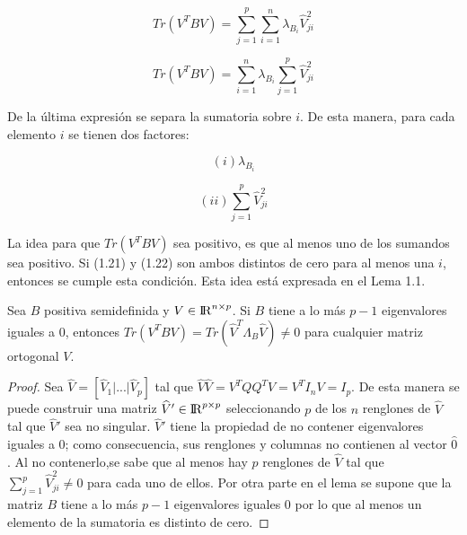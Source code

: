 \begin{equation*} 
Tr(V^T B V) = \sum \limits_{j=1}^{p} \sum\limits_{i=1}^{n} \lambda_{B_i} \widehat{V}_{ji}^2
\end{equation*}

\begin{equation}\label{eq:2.21}
Tr(V^T B V) = \sum\limits_{i=1}^{n} \lambda_{B_i} \sum \limits_{j=1}^{p} \widehat{V}_{ji}^2    
\end{equation}

De la última expresión se separa la sumatoria sobre $i$. De esta manera, para cada elemento $i$ se tienen dos factores:

\begin{equation}\label{eq:2.22}
(i) \lambda_{B_i}
\end{equation}

 \begin{equation}\label{eq:2.23}
 (ii) \sum \limits_{j=1}^{p} \widehat{V}_{ji}^2   
 \end{equation}
 

 La idea para que $Tr(V^T B V)$ sea positivo, es que al menos uno de los sumandos sea positivo. Si (1.21) y (1.22) son ambos distintos de cero para al menos una $i$, entonces se cumple esta condición. Esta idea está expresada en el Lema 1.1.

\begin{lemma}\label{lemma2.4}
Sea $B$ positiva semidefinida y $V \in {\rm I\!R}^{n\times p}$. Si $B$ tiene a lo más $p-1$ eigenvalores iguales a $0$, entonces $Tr(V^T B V)  = Tr(\widehat{V}^T \Lambda_{B} \widehat{V}) \neq 0$  para cualquier matriz ortogonal $V$.
\end{lemma}

\begin{proof}
Sea $\widehat{V} = [\widehat{V}_1 | ... | \widehat{V}_p]$ tal que $\widehat{V} \widehat{V} = V^T Q Q^T V = V^T I_n V  = I_p$. De esta manera se puede construir una matriz $\widehat{V}' \in {\rm I\!R}^{p \times p}$ seleccionando $p$ de los $n$ renglones de $\widehat{V}$ tal que $\widehat{V}'$ sea no singular. $\widehat{V}'$ tiene la propiedad de no contener eigenvalores iguales a 0; como consecuencia, sus renglones y columnas no contienen al vector $\widehat{0}$. Al no contenerlo,se sabe que al menos hay $p$ renglones de $\widehat{V}$ tal que $\sum_{j=1}^{p}\widehat{V}_{ji}^2 \neq 0$ para cada uno de ellos. Por otra parte en el lema se supone que la matriz $B$ tiene a lo más $p-1$ eigenvalores iguales $0$ por lo que al menos un elemento de la sumatoria es distinto de cero.
\end{proof}

